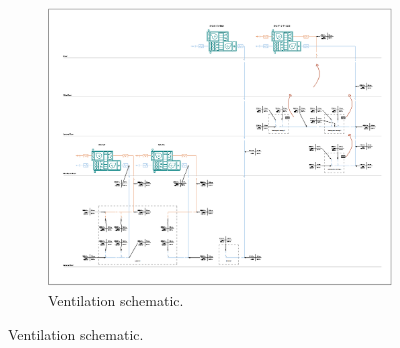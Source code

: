 \begin{figure}[htbp]
	\centering
	\begin{subfigure}[b]{0.48\textwidth}
		\includegraphics[width=\textwidth]{figures/VentilationSchem3.PNG}
		\caption[Arup ventilation schematic.]{Ventilation schematic.}\label{fig:ventilation}
	\end{subfigure}
	

\end{figure}
